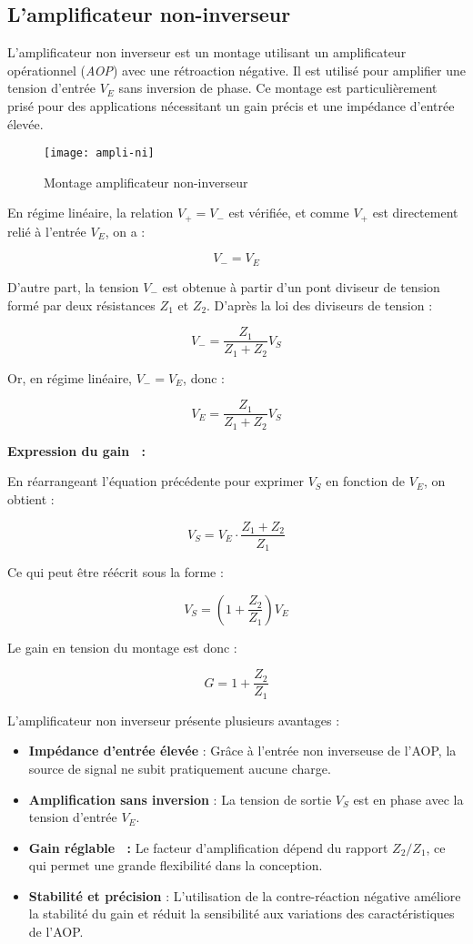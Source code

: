 \subsection{L’amplificateur non-inverseur}


L’amplificateur non inverseur est un montage utilisant un amplificateur 
opérationnel (\textit{AOP}) avec une rétroaction négative. Il est utilisé pour 
amplifier une tension d’entrée \( V_E \) sans inversion de phase. Ce montage est 
particulièrement prisé pour des applications nécessitant un gain précis et une 
impédance d’entrée élevée.

\begin{figure}[H]
    \centering
    \texttt{[image: ampli-ni]}
    \caption{Montage amplificateur non-inverseur}
    \label{figNonInverting}
\end{figure}


En régime linéaire, la relation \( V_+ = V_- \) est vérifiée, et comme \( V_+ \) 
est directement relié à l’entrée \( V_E \), on a :

\[
V_- = V_E
\]

D'autre part, la tension \( V_- \) est obtenue à partir d’un pont diviseur de 
tension formé par deux résistances \( Z_1 \) et \( Z_2 \). D’après la loi des 
diviseurs de tension :

\[
V_- = \frac{Z_1}{Z_1 + Z_2} V_S
\]

Or, en régime linéaire, \( V_- = V_E \), donc :

\[
V_E = \frac{Z_1}{Z_1 + Z_2} V_S
\]

\textbf{Expression du gain ~:}

En réarrangeant l’équation précédente pour exprimer \( V_S \) en fonction de 
\( V_E \), on obtient :

\[
V_S = V_E \cdot \frac{Z_1 + Z_2}{Z_1}
\]

Ce qui peut être réécrit sous la forme :

\[
V_S = \left( 1 + \frac{Z_2}{Z_1} \right) V_E
\]

Le gain en tension du montage est donc :

\[
G = 1 + \frac{Z_2}{Z_1}
\]

L’amplificateur non inverseur présente plusieurs avantages :
\begin{itemize}
    \item \textbf{Impédance d’entrée élevée} : Grâce à l’entrée non inverseuse de l’AOP, la source de signal ne subit pratiquement aucune charge.
    \item \textbf{Amplification sans inversion} : La tension de sortie \( V_S \) est en phase avec la tension d’entrée \( V_E \).
    \item \textbf{Gain réglable ~:} Le facteur d’amplification dépend du rapport \( Z_2 / Z_1 \), ce qui permet une grande flexibilité dans la conception.
    \item \textbf{Stabilité et précision} : L’utilisation de la contre-réaction négative améliore la stabilité du gain et réduit la sensibilité aux variations des caractéristiques de l’AOP.
\end{itemize}

